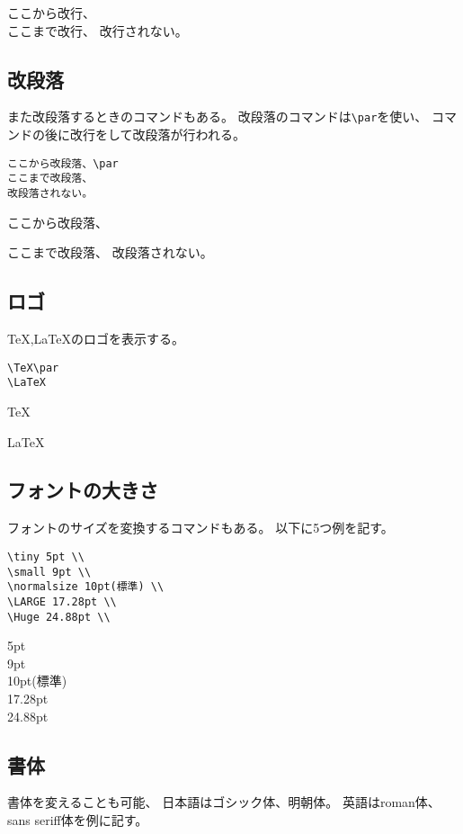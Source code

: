 \documentclass{jsarticle}
\begin{document}
ここから改行、\\ここまで改行、
改行されない。

\subsection{改段落}

また改段落するときのコマンドもある。
改段落のコマンドは\verb|\par|を使い、
コマンドの後に改行をして改段落が行われる。

\begin{verbatim}
ここから改段落、\par
ここまで改段落、
改段落されない。
\end{verbatim}

ここから改段落、\par
ここまで改段落、
改段落されない。


\subsection{ロゴ}
TeX,LaTeXのロゴを表示する。

\begin{verbatim}
\TeX\par
\LaTeX
\end{verbatim}

\TeX\par
\LaTeX

\subsection{フォントの大きさ}
フォントのサイズを変換するコマンドもある。
以下に5つ例を記す。

\begin{verbatim}
\tiny 5pt \\
\small 9pt \\
\normalsize 10pt(標準) \\
\LARGE 17.28pt \\
\Huge 24.88pt \\
\end{verbatim}

{
\noindent
\tiny 5pt \\
\small 9pt \\
\normalsize 10pt(標準) \\
\LARGE 17.28pt \\
\Huge 24.88pt \\
}

\subsection{書体}
書体を変えることも可能、
日本語はゴシック体、明朝体。
英語はroman体、sans seriff体を例に記す。
\end{document}
